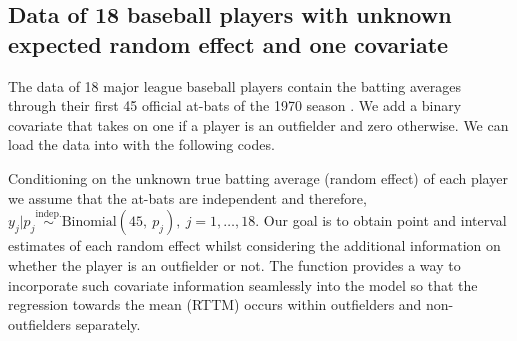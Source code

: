 \documentclass[article]{jss}
\begin{document}
\subsection[Unknown Second-level Mean and One Covariate]{Data of 18 baseball players with unknown expected random effect and one covariate} 

The data of 18 major league baseball players contain the batting averages through their first 45 official at-bats of the 1970 season \citep{1975}. We add a binary covariate that takes on one if a player is an outfielder and zero otherwise. We can load the data into  with the following codes.
\begin{CodeChunk}
\end{CodeChunk}
Conditioning on the unknown true batting average (random effect) of each player we assume that the at-bats are independent and therefore, $y_{j}\vert p_{j} \textrm{Binomial}(45,~ p_{j}), ~j=1, \ldots, 18$. Our goal is to obtain point and interval estimates of each random effect whilst considering the additional information on whether the player is an outfielder or not. The function  provides a way to incorporate such covariate information seamlessly into the model so that the regression towards the mean (RTTM) occurs within outfielders and non-outfielders separately. %
\end{document}
